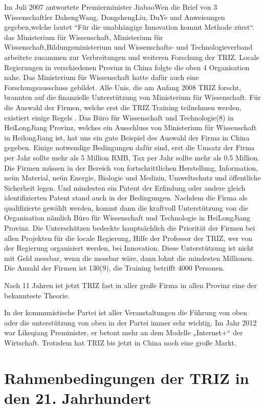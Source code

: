 \documentclass[11pt,a4paper]{article}
\begin{document}
Im Juli 2007 antwortete Premierminister JiabaoWen die Brief von 3
Wissenschaftler DahengWang, DongshengLiu, DuYe und Anweisungen gegeben,welche
lautet “Für die unabhängige Innovation kommt Methode zürst“.  das Ministerium
für Wissenschaft, Ministerium für Wissenschaft,Bildungsministerium und
Wissenschafts- und Technologieverband arbeitete zusammen zur Verbreitungen und
weiteren Forschung der TRIZ. Locale Regierungen in verschiedenen Provinz in
China folgte die oben 4 Organisation nahe. Das Ministerium für Wissenschaft
hatte dafür auch eine Forschungsausschuss gebildet. Alle Unis, die am Anfang
2008 TRIZ forscht, brannten auf die finanzielle Unterstützung von Ministerium
für Wissenschaft. Für die Auswahl der Firmen, welche erst die TRIZ Training
teilnehmen werden, existiert einige Regels . Das Büro für Wissenschaft und
Technologie(8) in HeiLongJiang Provinz, welches ein Ausschluss von Ministerium
für Wissenschaft in HeilongJiang ist, hat uns ein gute Beispiel des Auswahl
der Firma in China gegeben. Einige notwendige Bedingungen dafür sind, erst die
Umsatz der Firma per Jahr sollte mehr als 5 Million RMB, Tax per Jahr sollte
mehr als 0.5 Million. Die Firmen müssen in der Bereich von fortschrittlichen
Herstellung, Information, neün Material, neün Energie, Biologie und Medizin,
Umweltschutz und öffentliche Sicherheit legen. Und mindesten ein Patent der
Erfindung oder andere gleich identifizierten Patent stand auch in der
Bedingungen. Nachdem die Firma als qualifizierte gewählt werden, kommt dann
die kraftvoll Unterstützung von die Organisation nämlich Büro für Wissenschaft
und Technologie in HeiLongJiang Provinz. Die Unterschützen bedeckte
hauptsächlich die Priorität der Firmen bei allen Projekten für die locale
Regierung, Hilfe der Professor der TRIZ, wer von der Regierung organisiert
werden, bei Innovation. Diese Unterstützung ist nicht mit Geld messbar, wenn
die messbar wäre, dann lohnt die mindesten Millionen. Die Anzahl der Firmen
ist 130(9), die Training betrifft 4000 Personen.

Nach 11 Jahren ist jetzt TRIZ fast in aller große Firma in allen Provinz eine
der bekannteste Theorie.

In der kommunistische Partei ist aller Veranstaltungen die Führung von oben
oder die unterstützung von oben in der Partei immer sehr wichtig. Im Jahr 2012
war Likeqiang Preminister, er betont mehr an dem Modelle „Internet+“ der
Wirtschaft. Trotzdem hat TRIZ bis jetzt in China noch eine große Markt.


\section{Rahmenbedingungen der TRIZ in den 21. Jahrhundert}
\end{document}
